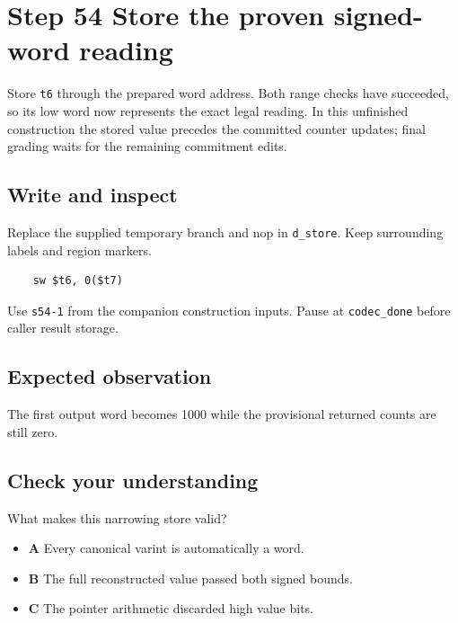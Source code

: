 \section{Step 54 Store the proven signed-word reading}\label{delta-s54}

Store \texttt{t6} through the prepared word address. Both range checks have succeeded, so its low word now represents the exact legal reading. In this unfinished construction the stored value precedes the committed counter updates; final grading waits for the remaining commitment edits.

\subsection{Write and inspect}
Replace the supplied temporary branch and nop in \texttt{d\_store}. Keep surrounding labels and region markers.

\begin{verbatim}
    sw $t6, 0($t7)
\end{verbatim}
Use \texttt{s54-1} from the companion construction inputs. Pause at \texttt{codec\_done} before caller result storage.

\subsection{Expected observation}
The first output word becomes 1000 while the provisional returned counts are still zero.

\subsection{Check your understanding}
What makes this narrowing store valid?

\begin{itemize}
  \item \textbf{A} Every canonical varint is automatically a word.
  \item \textbf{B} The full reconstructed value passed both signed bounds.
  \item \textbf{C} The pointer arithmetic discarded high value bits.
\end{itemize}
